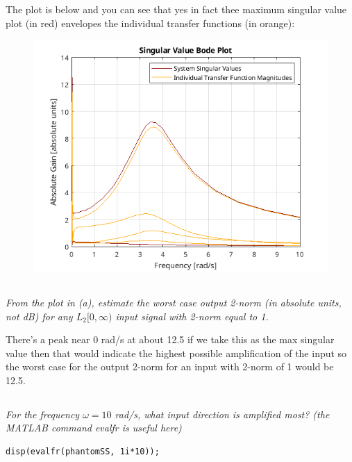 \documentclass{article}
\begin{document}
The plot is below and you can see that yes in fact thee maximum singular value plot (in red) envelopes the individual transfer functions (in orange):

\begin{figure}[H]
    \centering
    \includegraphics[width=\textwidth]{singularValuePlot.png}
\end{figure}

\subsection{}

\textit{From the plot in (a), estimate the worst case output 2-norm (in absolute units, not dB) for any $L_2[0, \infty)$ input signal with 2-norm equal to 1.}

There's a peak near 0 rad/s at about 12.5 if we take this as the max singular value then that would indicate the highest possible amplification of the input so the worst case for the output 2-norm for an input with 2-norm of 1 would be 12.5.

\subsection{}

\textit{For the frequency $\omega=10$ rad/s, what input direction is amplified most? (the MATLAB command evalfr is useful here)}

\begin{lstlisting}[style=matlabstyle]
disp(evalfr(phantomSS, 1i*10));    
\end{lstlisting}
\end{document}
